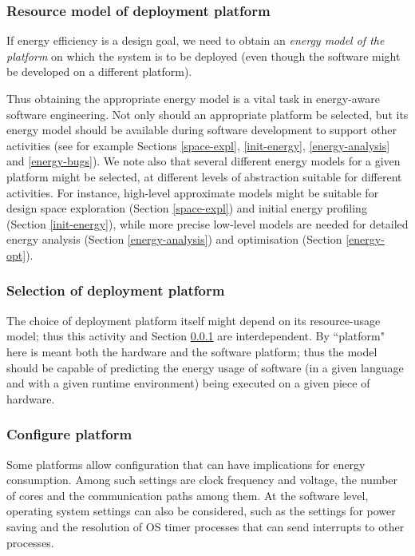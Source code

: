 \documentclass[11pt,oneside]{book}
\begin{document}
\subsubsection{Resource model of deployment platform}\label{platform-model}

If energy efficiency is a design goal, we need to obtain an \emph{energy model
of the platform} on which the system is to be deployed (even though the
software might be developed on a different platform).

Thus obtaining the appropriate energy model is a vital task in energy-aware 
software engineering.  Not only should an appropriate platform be selected, but
its energy model should be available during software development to support other 
activities (see for example Sections \ref{space-expl}, \ref{init-energy}, \ref{energy-analysis} and \ref{energy-bugs}).
We note also that several different energy models for a given platform might be
selected, at different levels of abstraction suitable for different activities.  For instance,
high-level approximate models might be suitable for design space exploration (Section \ref{space-expl}) and initial energy profiling (Section \ref{init-energy}), while more precise low-level models are needed for detailed energy analysis (Section \ref{energy-analysis}) and optimisation 
(Section \ref{energy-opt}).

\subsubsection{Selection of deployment platform}\label{platform-choice}

The choice of deployment platform itself might depend on its resource-usage model; thus 
this activity and Section \ref{platform-model} are interdependent.
By ``platform"
here is meant both the hardware and the software platform; thus the model
should be capable of predicting the energy usage of software (in a given language
and with a given runtime environment) 
being executed on a given piece of hardware.

\subsubsection{Configure platform}\label{platform-config}

Some platforms allow configuration that can have implications for energy consumption.
Among such settings are clock frequency and voltage, the
number of cores and the communication paths among them. At the software level,
operating system settings can also be considered, such as the settings for power saving 
and the resolution of OS
timer processes that can send interrupts to other processes.
\end{document}

